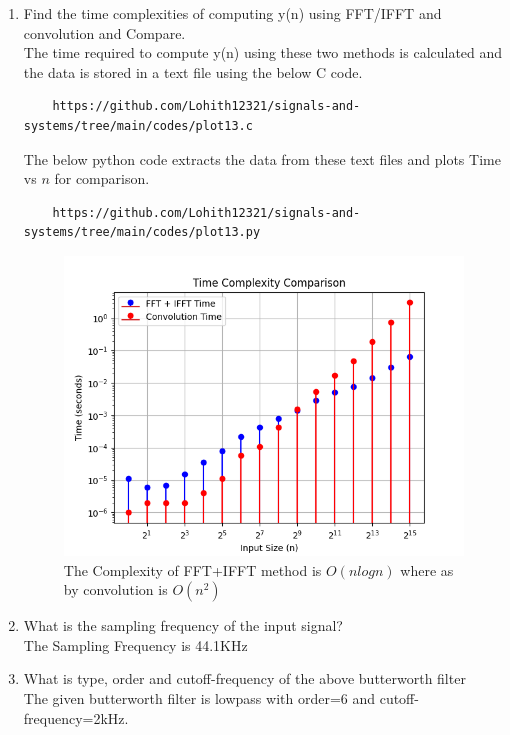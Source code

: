 \documentclass[journal,12pt,twocolumn]{IEEEtran}
\theoremstyle{remark}
\begin{document}
\begin{enumerate}[label=\thesection.\arabic*
,ref=\thesection.\theenumi]
\begin{enumerate}[label=\thesection.\arabic*
,ref=\thesection.\theenumi]
Before executing the python code. Execute the following command.
\begin{lstlisting}
    gcc −shared −o fft.so −fPIC fft.c
\end{lstlisting}
then execute this python code
\begin{lstlisting}
    https://github.com/Lohith12321/signals-and-systems/tree/main/codes/fft.py 
\end{lstlisting}
\item Find the time complexities of computing y(n)
using FFT/IFFT and convolution and Compare.\\
\solution The time required to compute y(n) using these two methods is calculated and the data is stored in a text file using the below C code.
\begin{lstlisting}
    https://github.com/Lohith12321/signals-and-systems/tree/main/codes/plot13.c 
\end{lstlisting}
The below python code extracts the data from these text files and plots Time vs $n$ for comparison.
\begin{lstlisting}
    https://github.com/Lohith12321/signals-and-systems/tree/main/codes/plot13.py 
\end{lstlisting}
\begin{figure}[ht]
\centering
\includegraphics[width=1\columnwidth]{figs/plot13.png}
\caption{The Complexity of FFT+IFFT method is $ O(nlogn)$ where as by convolution is $O(n^2)$}
\label{fig:time_complexity}
\end{figure}
\item What is the sampling frequency of the input signal?\\
\solution The Sampling Frequency is 44.1KHz
\item
What is type, order and  cutoff-frequency of the above butterworth filter
\\
\solution The given butterworth filter is lowpass with order=6 and cutoff-frequency=2kHz.


\end{enumerate}
\end{enumerate}
\end{document}
